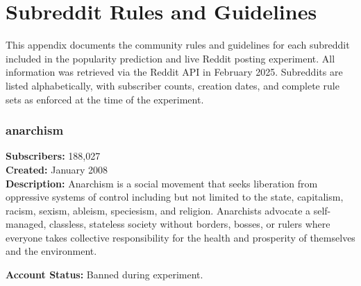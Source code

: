 \chapter{Subreddit Rules and Guidelines}
\label{app:subreddit_rules}

This appendix documents the community rules and guidelines for each subreddit included in the popularity prediction and live Reddit posting experiment. All information was retrieved via the Reddit API in February 2025. Subreddits are listed alphabetically, with subscriber counts, creation dates, and complete rule sets as enforced at the time of the experiment.

\subsection{anarchism}
\textbf{Subscribers:} 188,027 \\
\textbf{Created:} January 2008 \\
\textbf{Description:} Anarchism is a social movement that seeks liberation from oppressive systems of control including but not limited to the state, capitalism, racism, sexism, ableism, speciesism, and religion. Anarchists advocate a self-managed, classless, stateless society without borders, bosses, or rulers where everyone takes collective responsibility for the health and prosperity of themselves and the environment.

\textbf{Account Status:} Banned during experiment.


